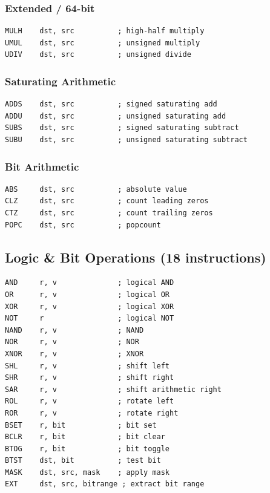 \documentclass[12pt]{article}
\begin{document}
\subsubsection{Extended / 64-bit}

\begin{lstlisting}
MULH    dst, src          ; high-half multiply
UMUL    dst, src          ; unsigned multiply
UDIV    dst, src          ; unsigned divide
\end{lstlisting}

\subsubsection{Saturating Arithmetic}

\begin{lstlisting}
ADDS    dst, src          ; signed saturating add
ADDU    dst, src          ; unsigned saturating add
SUBS    dst, src          ; signed saturating subtract
SUBU    dst, src          ; unsigned saturating subtract
\end{lstlisting}

\subsubsection{Bit Arithmetic}

\begin{lstlisting}
ABS     dst, src          ; absolute value
CLZ     dst, src          ; count leading zeros
CTZ     dst, src          ; count trailing zeros
POPC    dst, src          ; popcount
\end{lstlisting}

\subsection{Logic \& Bit Operations (18 instructions)}

\begin{lstlisting}
AND     r, v              ; logical AND
OR      r, v              ; logical OR
XOR     r, v              ; logical XOR
NOT     r                 ; logical NOT
NAND    r, v              ; NAND
NOR     r, v              ; NOR
XNOR    r, v              ; XNOR
SHL     r, v              ; shift left
SHR     r, v              ; shift right
SAR     r, v              ; shift arithmetic right
ROL     r, v              ; rotate left
ROR     r, v              ; rotate right
BSET    r, bit            ; bit set
BCLR    r, bit            ; bit clear
BTOG    r, bit            ; bit toggle
BTST    dst, bit          ; test bit
MASK    dst, src, mask    ; apply mask
EXT     dst, src, bitrange ; extract bit range
\end{lstlisting}
\end{document}
